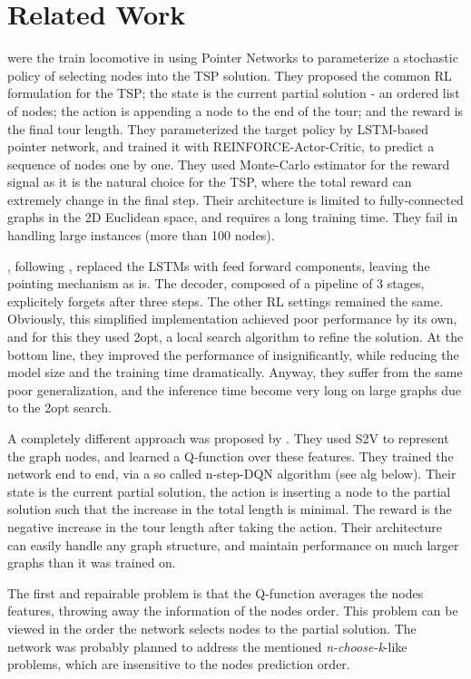 \documentclass[10pt,a4paper,draft]{article}
\begin{document}
\section{Related Work}
\cite{bello16-tsp-pnac} were the train locomotive in using Pointer Networks to parameterize a stochastic policy of selecting nodes into the TSP solution. They proposed the common RL formulation for the TSP; the state is the current partial solution - an ordered list of nodes; the action is appending a node to the end of the tour; and the reward is the final tour length. They parameterized the target policy by LSTM-based pointer network, and trained it with REINFORCE-Actor-Critic, to predict a sequence of nodes one by one. They used Monte-Carlo estimator for the reward signal as it is the natural choice for the TSP, where the total reward can extremely change in the final step. Their architecture is limited to fully-connected graphs in the 2D Euclidean space, and requires a long training time. They fail in handling large instances (more than 100 nodes).

\cite{deudon18-tsp-nr2opt}, following \cite{bello16-tsp-pnac}, replaced the LSTMs with feed forward components, leaving the pointing mechanism as is. The decoder, composed of a pipeline of 3 stages, explicitely forgets after three steps. The other RL settings remained the same. Obviously, this simplified implementation achieved poor performance by its own, and for this they used 2opt, a local search algorithm to refine the solution. At the bottom line, they improved the performance of \cite{bello16-tsp-pnac} insignificantly, while reducing the model size and the training time dramatically. Anyway, they suffer from the same poor generalization, and the inference time become very long on large graphs due to the 2opt search.

A completely different approach was proposed by \cite{dai17-tsp-s2v}. They used S2V \cite{dai16-s2v} to represent the graph nodes, and learned a Q-function over these features. They trained the network end to end, via a so called n-step-DQN algorithm (see alg below). Their state is the current partial solution, the action is inserting a node to the partial solution such that the increase in the total length is minimal. The reward is the negative increase in the tour length after taking the action. Their architecture can easily handle any graph structure, and maintain performance on much larger graphs than it was trained on. 

The first and repairable problem is that the Q-function averages the nodes features, throwing away the information of the nodes order. This problem can be viewed in the order the network selects nodes to the partial solution. The network was probably planned to address the mentioned \textit{n-choose-k}-like problems, which are insensitive to the nodes prediction order.
\end{document}

